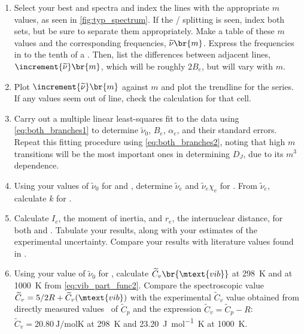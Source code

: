 \begin{enumerate}
	\item Select your best  and  spectra and index the lines with the appropriate \( m \) values, as seen in \cref{fig:typ_spectrum}. 
	If the / splitting is seen, index both sets, but be sure to separate them appropriately.
	Make a table of these \( m \) values and the corresponding frequencies, \( \widetilde{\nu}\br{m} \). 
	Express the frequencies in \si{\wn} to the tenth of a \si{\wn}. 
	Then, list the differences between adjacent lines, \( \increment{\widetilde{\nu}}\br{m} \), which will be roughly \( 2 B_e \), but will vary with \( m \). 
	\item Plot \( \increment{\widetilde{\nu}}\br{m} \) against \( m \) and plot the trendline for the series. 
	If any values seem out of line, check the calculation for that cell. 
	\item Carry out a multiple linear least-squares fit to the data using \cref{eq:both_branches1} to determine \( \widetilde{\nu}_0 \), \( B_e \), \( \alpha_e \), and their standard errors. 
	Repeat this fitting procedure using \cref{eq:both_branches2}, noting that high \( m \) transitions will be the most important ones in determining \( D_J \), due to its \( m^3 \) dependence. 
	\item Using your values of \( \widetilde{\nu}_0 \) for  and , determine \( \widetilde{\nu}_e \) and \( \widetilde{\nu}_e \chi_e \) for . From \( \widetilde{\nu}_e \), calculate \( k \) for . 
	\item Calculate \( I_e \), the moment of inertia, and \( r_e \), the internuclear distance, for both  and . 
	Tabulate your results, along with your estimates  of the experimental uncertainty. Compare your results with literature values found in \textcite{kerr82}. 
	\item Using your value of \( \widetilde{\nu}_0 \) for , calculate \( \widetilde{C}_v\br{\mtext{vib}} \) at \SI{298}{\K} and at \SI{1000}{\K} from \cref{eq:vib_part_func2}. 
	Compare the spectroscopic value \( \widetilde{C}_v = 5/2 R + \widetilde{C}_v(\mtext{vib}) \) with the experimental \( \widetilde{C}_v \) value obtained from directly measured values~\autocite{lewis61,spencer48} of \( \widetilde{C}_p \) and the expression \( \widetilde{C}_v = \widetilde{C}_p - R \): \( \widetilde{C}_v = \SI{20.80}{\J \per \mole\K} \) at \SI{298}{K} and \SI{23.20}{\J \per \mol\K} at \SI{1000}{\K}. 
\end{enumerate}

